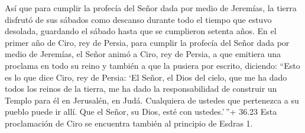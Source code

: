  Así que para cumplir la profecía del Señor dada por medio
de Jeremías, la tierra disfrutó de sus sábados como descanso durante
todo el tiempo que estuvo desolada, guardando el sábado hasta que se
cumplieron setenta años.  En el primer año de Ciro, rey de
Persia, para cumplir la profecía del Señor dada por medio de Jeremías,
el Señor animó a Ciro, rey de Persia, a que emitiera una proclama en
todo su reino y también a que la pusiera por escrito, diciendo:
 ``Esto es lo que dice Ciro, rey de Persia: `El Señor, el
Dios del cielo, que me ha dado todos los reinos de la tierra, me ha dado
la responsabilidad de construir un Templo para él en Jerusalén, en Judá.
Cualquiera de ustedes que pertenezca a su pueblo puede ir allí. Que el
Señor, su Dios, esté con ustedes.'\,''+ 36.23 Esta proclamación de Ciro
se encuentra también al principio de Esdras 1.
